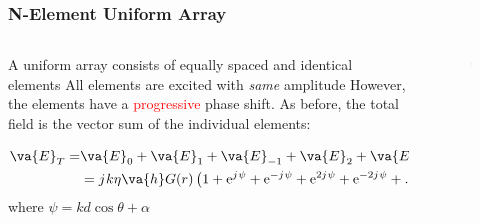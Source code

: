 \documentclass[10pt]{beamer}
\newcommand{\e}{\mathrm{e}} %
\renewcommand{\j}{{j}\mkern1mu} %
\begin{document}
\begin{frame}
    \frametitle{N-Element Uniform Array}
    \begin{columns}[T] %
        \begin{column}{.6\textwidth}
            \begin{outline}
                \1 A uniform array consists of equally spaced and identical elements
                \2 All elements are excited with \textit{same} amplitude
                \2 However, the elements have a \textcolor{red}{progressive} phase shift.
                \1 As before, the total field is the vector sum of the individual elements:
            \end{outline}
\begin{align*}
    \va{E}_T {}=& \va{E}_0 + \va{E}_1 + \va{E}_{-1} + \va{E}_2 + \va{E}_{-2} + \dots \\
    &= \j k \eta \va{h} G(r) \left( 1 + \e^{\j \psi} + \e^{-\j \psi} + \e^{2\j \psi}+ \e^{-2\j \psi} + \dots \right) 
 \end{align*}  
 where $\psi = k d \cos \theta + \alpha$
        \end{column}
        \begin{column}{.5\textwidth}
            \begin{figure}[T!]
                \centering
                \includegraphics[height=1.3\textwidth]{N_elements.pdf}
            \end{figure}
        \end{column}%
    \end{columns}
\end{frame}
\end{document}
